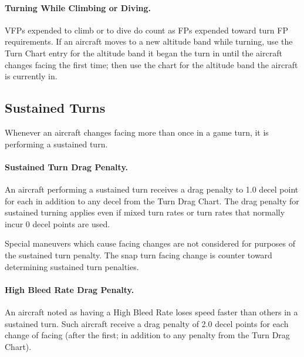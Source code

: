 

\paragraph{Turning While Climbing or Diving.} VFPs expended to climb or to dive do count as FPs expended toward turn FP requirements. If an aircraft moves to a new altitude band while turning, use the Turn Chart entry for the altitude band it began the turn in until the aircraft changes facing the first time; then use the chart for the altitude band the aircraft is currently in.

\advancedrules

\subsection{Sustained Turns}

Whenever an aircraft changes facing more than once in a game turn, it is performing a sustained turn.

\paragraph{Sustained Turn Drag Penalty.} An aircraft performing a sustained turn receives a drag penalty to 1.0 decel point for each  in addition to any decel from the Turn Drag Chart. The drag penalty for sustained turning applies even if mixed turn rates or turn rates that normally incur 0 decel points are used.  

Special maneuvers which cause facing changes are not considered for purposes of the sustained turn penalty. The snap turn facing change is counter toward determining sustained turn penalties.

\paragraph{High Bleed Rate Drag Penalty.} An aircraft noted as having a High Bleed Rate loses speed faster than others in a sustained turn. Such aircraft receive a drag penalty of 2.0 decel points for each change of facing (after the first; in addition to any penalty from the Turn Drag Chart).

